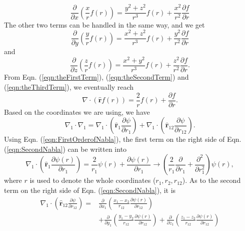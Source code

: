 \begin{equation}
    \frac{\partial}{\partial x}\left(\frac{x}{r}f(r)\right)=\frac{y^2+z^2}{r^3}f(r)+\frac{x^2}{r^2}\frac{\partial f}{\partial r}
    \label{eqn:theFirstTerm}
\end{equation}
The other two terms can be handled in the same way, and we get 
\begin{equation}
    \frac{\partial}{\partial y}\left(\frac{y}{r}f(r)\right)=\frac{x^2+z^2}{r^3}f(r)+\frac{y^2}{r^2}\frac{\partial f}{\partial r}
    \label{eqn:theSecondTerm}
\end{equation}
and
\begin{equation}
    \frac{\partial}{\partial z}\left(\frac{z}{r}f(r)\right)=\frac{x^2+y^2}{r^3}f(r)+\frac{z^2}{r^2}\frac{\partial f}{\partial r}.
    \label{eqn:theThirdTerm}
\end{equation}
From Eqn. (\ref{eqn:theFirstTerm}), (\ref{eqn:theSecondTerm}) and (\ref{eqn:theThirdTerm}), we eventually reach
\begin{equation}
    \nabla\cdot\left(\hat{\textbf{r}}f(r)\right)=\frac{2}{r}f(r)+\frac{\partial f}{\partial r}.
    \label{eqn:FirstOrderofNabla}
\end{equation}
Based on the coordinates we are using, we have 
\begin{equation}
    \nabla_1\cdot\nabla_1=\nabla_1\cdot\left(\hat{\textbf{r}}_1\frac{\partial\psi}{\partial r_1}\right)+\nabla_1\cdot\left(\hat{\textbf{r}}_{12}\frac{\partial\psi}{\partial r_{12}}\right).
    \label{eqn:SecondNabla}
\end{equation}
Using Eqn. (\ref{eqn:FirstOrderofNabla}), the first term on the right side of Eqn. (\ref{eqn:SecondNabla}) can be written into
\begin{equation}
    \nabla_1\cdot\left(\hat{\textbf{r}}_1\frac{\partial\psi(r)}{\partial r_1}\right)=\frac{2}{r_1}\psi(r)+\frac{\partial\psi(r)}{\partial r_1}\rightarrow\left(\frac{2}{r_1}\frac{\partial}{\partial r_1}+\frac{\partial^2}{\partial r_1^2}\right)\psi(r),
    \label{eqn:secondNablaonr_1a}
\end{equation}
where $r$ is used to denote the whole coordinates ($r_1, r_2, r_{12}$).
As to the second term on the right side of Eqn. (\ref{eqn:SecondNabla}), it is 
\begin{equation}
    \begin{split}
        \nabla_1\cdot\left(\hat{\textbf{r}}_{12}\frac{\partial\psi}{\partial r_{12}}\right)=&\frac{\partial}{\partial x_1}\left(\frac{x_1-x_2}{r_{12}}\frac{\partial\psi(r)}{\partial r_{12}}\right) \\
        &+\frac{\partial}{\partial y_1}\left(\frac{y_1-y_2}{r_{12}}\frac{\partial\psi(r)}{\partial r_{12}}\right)+\frac{\partial}{\partial z_1}\left(\frac{z_1-z_2}{r_{12}}\frac{\partial\psi(r)}{\partial r_{12}}\right)
    \end{split}
    \label{eqn:secondNabla_2}    
\end{equation}
